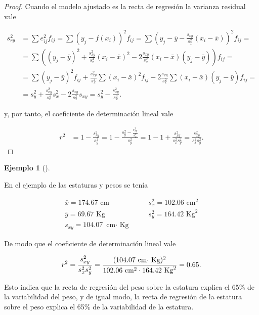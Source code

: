\documentclass[
  spanish,
  a4paper,
]{scrreport}
\theoremstyle{plain}
\theoremstyle{definition}
\newtheorem{example}{Ejemplo}[chapter]
\theoremstyle{definition}
\theoremstyle{remark}
\begin{document}
\begin{tcolorbox}[enhanced jigsaw, arc=.35mm, bottomrule=.15mm, bottomtitle=1mm, breakable, colback=white, colbacktitle=quarto-callout-note-color!10!white, colframe=quarto-callout-note-color-frame, coltitle=black, left=2mm, leftrule=.75mm, opacityback=0, opacitybacktitle=0.6, rightrule=.15mm, title=\textcolor{quarto-callout-note-color}{\faInfo}\hspace{0.5em}{Demostración}, titlerule=0mm, toprule=.15mm, toptitle=1mm]

\begin{proof}
Cuando el modelo ajustado es la recta de regresión la varianza residual
vale

\begin{align*}
s_{ry}^2 & = \sum e_{ij}^2f_{ij} = \sum (y_j - f(x_i))^2f_{ij} = \sum \left(y_j - \bar y -\frac{s_{xy}}{s_x^2}(x_i-\bar x) \right)^2f_{ij}=\\
& = \sum \left((y_j - \bar y)^2 +\frac{s_{xy}^2}{s_x^4}(x_i-\bar x)^2 - 2\frac{s_{xy}}{s_x^2}(x_i-\bar x)(y_j -\bar y)\right)f_{ij} =\\
& = \sum (y_j - \bar y)^2f_{ij} +\frac{s_{xy}^2}{s_x^4}\sum (x_i-\bar x)^2f_{ij}- 2\frac{s_{xy}}{s_x^2}\sum (x_i-\bar x)(y_j -\bar y)f_{ij}=\\
& = s_y^2 + \frac{s_{xy}^2}{s_x^4}s_x^2 - 2 \frac{s_{xy}}{s_x^2}s_{xy} = s_y^2 - \frac{s_{xy}^2}{s_x^2}.
\end{align*}

y, por tanto, el coeficiente de determinación lineal vale

\begin{align*}
r^2 &= 1- \frac{s_{ry}^2}{s_y^2} = 1- \frac{s_y^2 - \frac{s_{xy}^2}{s_x^2}}{s_y^2} = 1 - 1 + \frac{s_{xy}^2}{s_x^2s_y^2} = \frac{s_{xy}^2}{s_x^2s_y^2}.
\end{align*}
\end{proof}

\end{tcolorbox}

\begin{example}[]\protect\hypertarget{exm-coeficiente-determinacion}{}\label{exm-coeficiente-determinacion}

En el ejemplo de las estaturas y pesos se tenía

\[
\begin{array}{lll}
\bar x = 174.67 \mbox{ cm} & \quad & s^2_x = 102.06 \mbox{ cm}^2\\
\bar y = 69.67 \mbox{ Kg} & & s^2_y = 164.42 \mbox{ Kg}^2\\
s_{xy} = 104.07 \mbox{ cm$\cdot$ Kg}
\end{array}
\]

De modo que el coeficiente de determinación lineal vale

\[
r^2 
= \frac{s_{xy}^2}{s_x^2s_y^2} 
= \frac{(104.07 \mbox{ cm$ \cdot$ Kg})^2}{102.06 \mbox{ cm}^2 \cdot 164.42 \mbox{ Kg}^2} 
= 0.65.
\]

Esto indica que la recta de regresión del peso sobre la estatura explica
el 65\% de la variabilidad del peso, y de igual modo, la recta de
regresión de la estatura sobre el peso explica el 65\% de la
variabilidad de la estatura.

\end{example}
\end{document}
